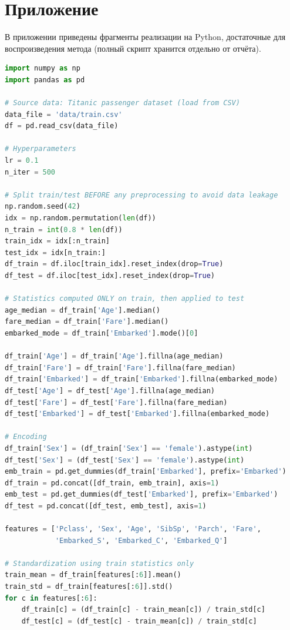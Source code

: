 \documentclass[12pt,a4paper]{article}
\begin{document}
\section{Приложение}
В приложении приведены фрагменты реализации на Python, достаточные для воспроизведения метода (полный скрипт хранится отдельно от отчёта).

\begin{lstlisting}[language=Python, frame=single, basicstyle=\footnotesize\ttfamily]
import numpy as np
import pandas as pd

# Source data: Titanic passenger dataset (load from CSV)
data_file = 'data/train.csv'
df = pd.read_csv(data_file)

# Hyperparameters
lr = 0.1
n_iter = 500

# Split train/test BEFORE any preprocessing to avoid data leakage
np.random.seed(42)
idx = np.random.permutation(len(df))
n_train = int(0.8 * len(df))
train_idx = idx[:n_train]
test_idx = idx[n_train:]
df_train = df.iloc[train_idx].reset_index(drop=True)
df_test = df.iloc[test_idx].reset_index(drop=True)

# Statistics computed ONLY on train, then applied to test
age_median = df_train['Age'].median()
fare_median = df_train['Fare'].median()
embarked_mode = df_train['Embarked'].mode()[0]

df_train['Age'] = df_train['Age'].fillna(age_median)
df_train['Fare'] = df_train['Fare'].fillna(fare_median)
df_train['Embarked'] = df_train['Embarked'].fillna(embarked_mode)
df_test['Age'] = df_test['Age'].fillna(age_median)
df_test['Fare'] = df_test['Fare'].fillna(fare_median)
df_test['Embarked'] = df_test['Embarked'].fillna(embarked_mode)

# Encoding
df_train['Sex'] = (df_train['Sex'] == 'female').astype(int)
df_test['Sex'] = (df_test['Sex'] == 'female').astype(int)
emb_train = pd.get_dummies(df_train['Embarked'], prefix='Embarked')
df_train = pd.concat([df_train, emb_train], axis=1)
emb_test = pd.get_dummies(df_test['Embarked'], prefix='Embarked')
df_test = pd.concat([df_test, emb_test], axis=1)

features = ['Pclass', 'Sex', 'Age', 'SibSp', 'Parch', 'Fare',
            'Embarked_S', 'Embarked_C', 'Embarked_Q']

# Standardization using train statistics only
train_mean = df_train[features[:6]].mean()
train_std = df_train[features[:6]].std()
for c in features[:6]:
    df_train[c] = (df_train[c] - train_mean[c]) / train_std[c]
    df_test[c] = (df_test[c] - train_mean[c]) / train_std[c]


\end{lstlisting}
\end{document}
